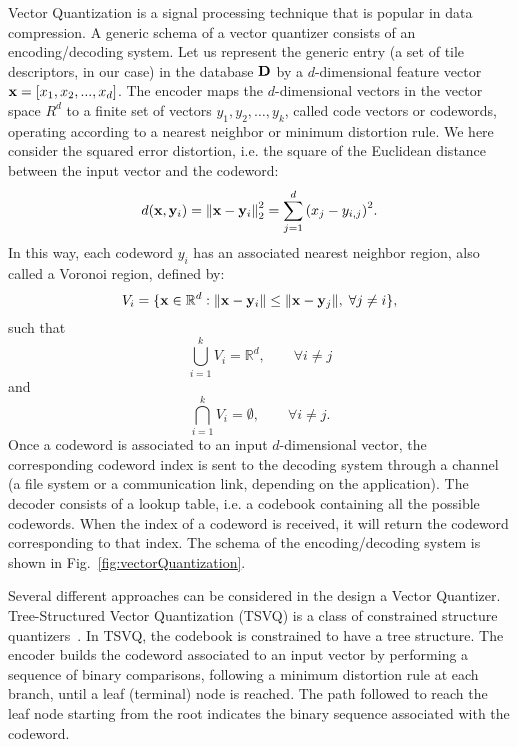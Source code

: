Vector Quantization is a signal processing technique that is popular in data compression. 
A generic schema of a vector quantizer consists of an encoding/decoding system.
Let us represent the generic entry (a set of tile descriptors, in our case) in the database ${\bf{D}}$ by a $d$-dimensional feature vector ${{\bf{x}}} = \left[ {{x_{1}},{x_{2}},...,{x_{d}}} \right]$.
The encoder maps the $d$-dimensional vectors in the vector space $R^d$ to a finite set of vectors $y_1, y_2, \dots, y_k$, called code vectors or codewords, operating according to a nearest neighbor or minimum distortion rule. 
We here consider the squared error distortion, i.e. the  square of the Euclidean distance between the  input vector and the codeword:
\begin{equation}
	d({\bf{x}},{{\bf{y}}_i}) = \left\| {{\bf{x}} - {{\bf{y}}_i}} \right\|_2^2 = \sum\limits_{j = 1}^d {{{({{x}}_j - {{{y}}_{i,j}})}^2}} \text{.}
\end{equation}
In this way, each codeword $y_i$ has an associated nearest neighbor region, also called a Voronoi region, defined by:
\begin{equation}
	{V_i} = \{ {\bf{x}} \in \mathbb{R}{^d}: \| {{\bf{x}} - {{\bf{y}}_i}} \| \le \| {{\bf{x}} - {{\bf{y}}_j}} \|, \; \forall j \ne i\} \text{,}
\end{equation}
such that
\begin{equation}
	\bigcup\limits_{i = 1}^k {{V_i}}  = {\mathbb{R}^d}, \qquad \forall i \ne j
\end{equation}
and
\begin{equation}
	\bigcap\limits_{i = 1}^k {{V_i}}  = \emptyset , \qquad \forall i \ne j \text{.}
\end{equation}
Once a codeword is associated to an input $d$-dimensional vector, the corresponding codeword index is sent to the decoding system through a channel (a file system or a communication link, depending on the application).
The decoder consists of a lookup table, i.e. a codebook containing all the possible codewords. When the index of a codeword is received, it will return the codeword corresponding to that index.
The schema of the encoding/decoding system is shown in Fig.~\ref{fig:vectorQuantization}.



Several different approaches can be considered in the  design a Vector Quantizer.
Tree-Structured Vector Quantization (TSVQ) is a class of constrained structure quantizers~\cite{cosman1993tree}.
In TSVQ, the codebook is constrained to have a tree structure.
The encoder builds the codeword associated to an input vector by performing a sequence of binary comparisons, following a minimum distortion rule at each branch, until a leaf (terminal) node is reached.
The path followed to reach the leaf node starting from the root indicates the binary sequence associated with the codeword.





